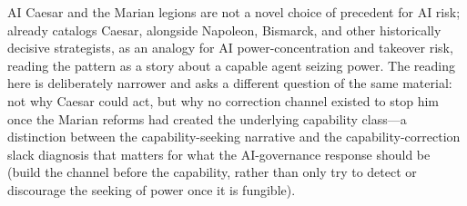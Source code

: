 \begin{refsection}
\begin{authbar}{AI}
Caesar and the Marian legions are not a novel choice of precedent for AI risk; \textcite{miller2025precedents} already catalogs Caesar, alongside Napoleon, Bismarck, and other historically decisive strategists, as an analogy for AI power-concentration and takeover risk, reading the pattern as a story about a capable agent seizing power. The reading here is deliberately narrower and asks a different question of the same material: not why Caesar could act, but why no correction channel existed to stop him once the Marian reforms had created the underlying capability class---a distinction between the capability-seeking narrative and the capability-correction slack diagnosis that matters for what the AI-governance response should be (build the channel before the capability, rather than only try to detect or discourage the seeking of power once it is fungible).

\end{authbar}
\authbarneedspace

\end{refsection}
